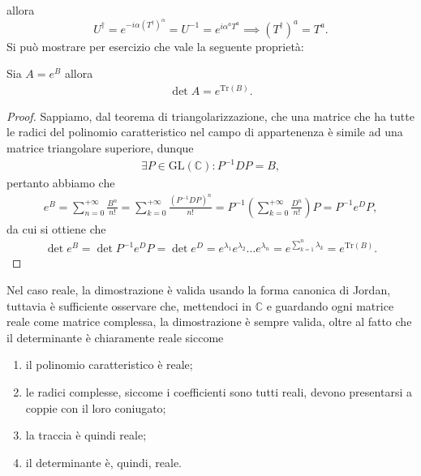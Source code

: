 allora
\begin{equation}
    U^\dag = e^{-i \alpha (T^\dagger)^\alpha} = U^{-1} = e^{i \alpha^a T^a} \implies (T^{\dagger})^a = T^a.
\end{equation}
Si può mostrare per esercizio che vale la seguente proprietà:
\begin{exercise}
    Sia $A = e^B$ allora
    \begin{align} \label{eq:tr_gen}
        \det{A} = e^{\text{Tr}(B)}.
    \end{align}
\end{exercise}
\begin{proof}
    Sappiamo, dal teorema di triangolarizzazione, che una matrice che ha tutte le radici del polinomio caratteristico nel campo di appartenenza è simile ad una matrice triangolare superiore, dunque
    \begin{align}
        \exists P \in \text{GL}(\mathbb{C}) : P^{-1} D P = B,
    \end{align}
    pertanto abbiamo che
    \begin{align}
        e^B = \sum_{n = 0}^{+\infty} \frac{B^n}{n!} = \sum_{k = 0}^{+\infty} \frac{(P^{-1} D P)^n}{n!} = P^{-1} \left( \sum_{k=0}^{+\infty} \frac{D^n}{n!} \right) P = P^{-1} e^D P,
    \end{align}
    da cui si ottiene che
    \begin{align}
        \det{e^B} = \det{P^{-1} e^D P} = \det{e^D} = e^{\lambda_1} e^{\lambda_2} \ldots e^{\lambda_n} = e^{\sum_{k = 1}^n \lambda_k} = e^{\text{Tr}(B)}.
    \end{align}
\end{proof}
\begin{remark}
    Nel caso reale, la dimostrazione è valida usando la forma canonica di Jordan, tuttavia è sufficiente osservare che, mettendoci in $\mathbb{C}$ e guardando ogni matrice reale come matrice complessa, la dimostrazione è sempre valida,
    oltre al fatto che il determinante è chiaramente reale siccome
    \begin{enumerate}
        \item il polinomio caratteristico è reale;
        \item le radici complesse, siccome i coefficienti sono tutti reali, devono presentarsi a coppie con il loro coniugato;
        \item la traccia è quindi reale;
        \item il determinante è, quindi, reale. 
    \end{enumerate}
\end{remark}


